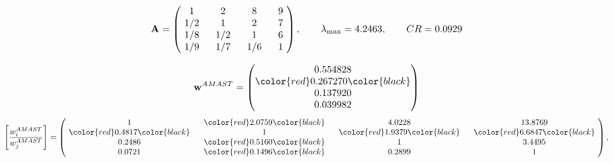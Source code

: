 \begin{example}
\begin{equation*}
\mathbf{A} =
\begin{pmatrix}
$\,\,$ 1 $\,\,$ & $\,\,$2$\,\,$ & $\,\,$8$\,\,$ & $\,\,$9 $\,\,$ \\
$\,\,$ 1/2$\,\,$ & $\,\,$ 1 $\,\,$ & $\,\,$2$\,\,$ & $\,\,$7 $\,\,$ \\
$\,\,$ 1/8$\,\,$ & $\,\,$ 1/2$\,\,$ & $\,\,$ 1 $\,\,$ & $\,\,$6 $\,\,$ \\
$\,\,$ 1/9$\,\,$ & $\,\,$ 1/7$\,\,$ & $\,\,$ 1/6$\,\,$ & $\,\,$ 1  $\,\,$ \\
\end{pmatrix},
\qquad
\lambda_{\max} =
4.2463,
\qquad
CR = 0.0929
\end{equation*}

\begin{equation*}
\mathbf{w}^{AMAST} =
\begin{pmatrix}
0.554828\\
\color{red} 0.267270\color{black} \\
0.137920\\
0.039982
\end{pmatrix}\end{equation*}
\begin{equation*}
\left[ \frac{{w}^{AMAST}_i}{{w}^{AMAST}_j} \right] =
\begin{pmatrix}
$\,\,$ 1 $\,\,$ & $\,\,$\color{red} 2.0759\color{black} $\,\,$ & $\,\,$4.0228$\,\,$ & $\,\,$13.8769$\,\,$ \\
$\,\,$\color{red} 0.4817\color{black} $\,\,$ & $\,\,$ 1 $\,\,$ & $\,\,$\color{red} 1.9379\color{black} $\,\,$ & $\,\,$\color{red} 6.6847\color{black}   $\,\,$ \\
$\,\,$0.2486$\,\,$ & $\,\,$\color{red} 0.5160\color{black} $\,\,$ & $\,\,$ 1 $\,\,$ & $\,\,$3.4495 $\,\,$ \\
$\,\,$0.0721$\,\,$ & $\,\,$\color{red} 0.1496\color{black} $\,\,$ & $\,\,$0.2899$\,\,$ & $\,\,$ 1  $\,\,$ \\
\end{pmatrix},
\end{equation*}


\end{example}
